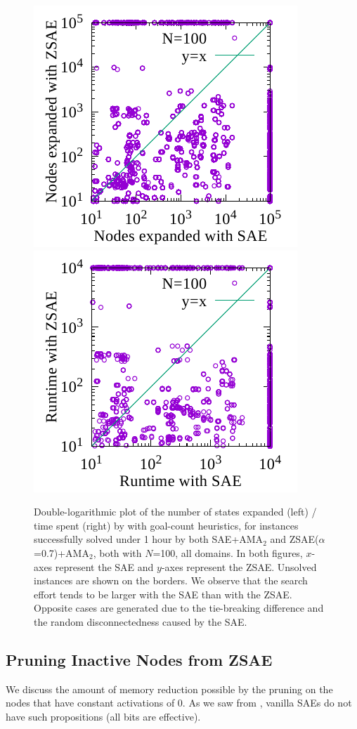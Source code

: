 \begin{figure}[tb]
 \centering
 \includegraphics[width=0.49\linewidth]{img/static/exp.pdf}
 \includegraphics[width=0.49\linewidth]{img/static/time.pdf}
 \caption{
Double-logarithmic plot of the number of states expanded (left) / time spent (right) by
\astar with goal-count heuristics,
for instances successfully solved under 1 hour by both SAE+AMA$_2$ and ZSAE($\alpha$=0.7)+AMA$_2$, both with $N$=100, all domains.
In both figures,
$x$-axes represent the SAE and $y$-axes represent the ZSAE.
Unsolved instances are shown on the borders.
% 
We observe that the search effort tends to be larger with the SAE than with the ZSAE.
Opposite cases are generated due to
the tie-breaking difference and
the random disconnectedness caused by the SAE.
}
 \label{fig:ama2-statistics}
\end{figure}


\subsection{Pruning Inactive Nodes from ZSAE}


We discuss the amount of memory reduction possible by the pruning on the nodes
that have constant activations of 0. As we saw from ,
vanilla SAEs do not have such propositions (all bits are effective).

